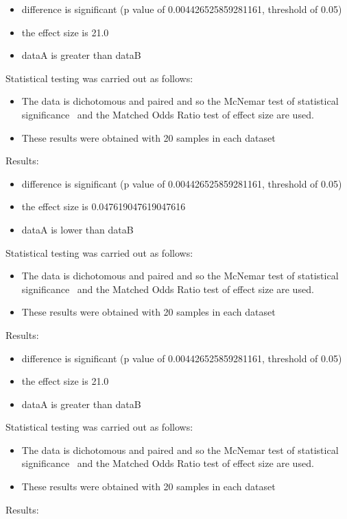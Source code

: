 \documentclass[]{article}
\begin{document}
\begin{itemize}
\item{difference is significant (p value of 0.004426525859281161, threshold of 0.05)}
\item{the effect size is 21.0}
\item{dataA is greater than dataB}
\end{itemize}Statistical testing was carried out as follows: \begin{itemize}
\item{The data is dichotomous and paired and so the McNemar test of statistical significance~\cite{Gibbons2011} and the Matched Odds Ratio test of effect size are used.}
\item{These results were obtained with 20 samples in each dataset}
\end{itemize}Results:
\begin{itemize}
\item{difference is significant (p value of 0.004426525859281161, threshold of 0.05)}
\item{the effect size is 0.047619047619047616}
\item{dataA is lower than dataB}
\end{itemize}Statistical testing was carried out as follows: \begin{itemize}
\item{The data is dichotomous and paired and so the McNemar test of statistical significance~\cite{Gibbons2011} and the Matched Odds Ratio test of effect size are used.}
\item{These results were obtained with 20 samples in each dataset}
\end{itemize}Results:
\begin{itemize}
\item{difference is significant (p value of 0.004426525859281161, threshold of 0.05)}
\item{the effect size is 21.0}
\item{dataA is greater than dataB}
\end{itemize}Statistical testing was carried out as follows: \begin{itemize}
\item{The data is dichotomous and paired and so the McNemar test of statistical significance~\cite{Gibbons2011} and the Matched Odds Ratio test of effect size are used.}
\item{These results were obtained with 20 samples in each dataset}
\end{itemize}Results:
\end{document}
